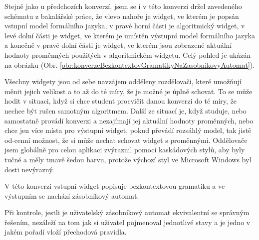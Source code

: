 
Stejně jako u předchozích konverzí, jsem se i v této konverzi držel zavedeného schématu z bakalářské práce, že vlevo nahoře je widget, ve kterém je popsán vstupní model formálního jazyka, v pravé horní části je algoritmický widget, v levé dolní části je widget, ve kterém je umístěn výstupní model formálního jazyka a konečně v pravé dolní části je widget, ve kterém jsou zobrazené aktuální hodnoty proměnných použitých v algoritmickém widgetu. Celý pohled je ukázán na obrázku (Obr. \ref{obr:konverzeBezkontextovGramatikyNaZasobnikovyAutomat}). 

Všechny widgety jsou od sebe navzájem odděleny rozdělovači, které umožňují měnit jejich velikost a to až do té míry, že je možné je úplně schovat. To se může hodit v situaci, když si chce student procvičit danou konverzi do té míry, že nechce být rušen samotným algoritmem. Další ze situací je, když studuje, nebo samostatně provádí konverzi a nezajímají jej aktuální hodnoty proměnných, nebo chce jen více místa pro výstupní widget, pokud převádí rozsáhlý model, tak jistě od-cenní možnost, že si může nechat schovat widget s proměnnými. Oddělovače jsem globálně pro celou aplikaci zvýraznil pomocí kaskádových stylů, aby byly tučné a měly tmavě šedou barvu, protože výchozí styl ve Microsoft Windows byl dosti nevýrazný.

V této konverzi vstupní widget popisuje bezkontextovou gramatiku a ve výstupním se nachází zásobníkový automat.

Při kontrole, jestli je uživatelský zásobníkový automat ekvivalentní se správným řešením, nezáleží na tom jak si uživatel pojmenoval jednotlivé stavy a je jedno v jakém pořadí vloží přechodová pravidla.



